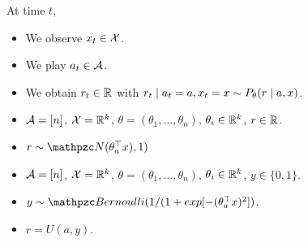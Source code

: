 \documentclass[9pt]{beamer}
\begin{document}
\begin{frame}
  \begin{definition}
    At time $t$,
    \begin{itemize}
    \item We observe $x_t \in {\mathcal{X}}$.
    \item We play $a_t \in {\mathcal{A}}$.
    \item We obtain $r_t \in {\mathbb{R}}$ with
      $r_t \mid a_t = a, x_t = x \sim P_\theta(r \mid a, x)$.
    \end{itemize}
  \end{definition}

  \begin{example}
    \begin{itemize}
    \item ${\mathcal{A}} = [n]$, ${\mathcal{X}} = {\mathbb{R}}^k$,
      $\theta = (\theta_1, \ldots, \theta_n)$,
      $\theta_i \in {\mathbb{R}}^k$, $r \in {\mathbb{R}}$.
    \item $r \sim \Normal(\transpose{\param_a} x), 1)$
    \end{itemize}
  \end{example}

  \begin{example}
    \begin{itemize}
    \item ${\mathcal{A}} = [n]$, ${\mathcal{X}} = {\mathbb{R}}^k$,
      $\theta = (\theta_1, \ldots, \theta_n)$,
      $\theta_i \in {\mathbb{R}}^k$, $y \in \{0,1\}$.
    \item $y \sim \Bernoulli(1/(1 + exp[- (\transpose{\param_a} x)^2])$.
    \item $r = U(a,y)$.
    \end{itemize}
  \end{example}


\end{frame}
\end{document}
